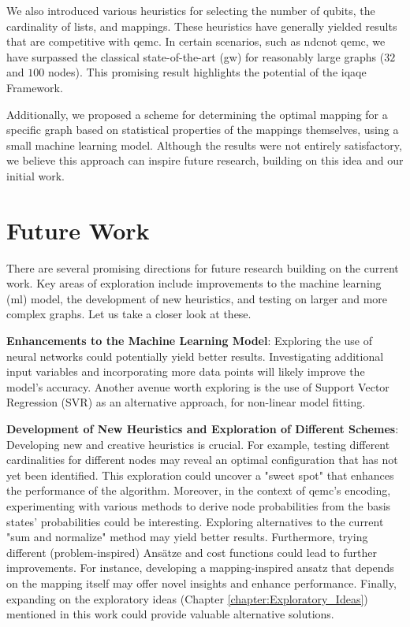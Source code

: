 We also introduced various heuristics for selecting the number of qubits, the cardinality of lists, and mappings. These heuristics have generally yielded results that are competitive with \acrshort{qemc}. In certain scenarios, such as \acrshort{ndcnot} \acrshort{qemc}, we have surpassed the classical state-of-the-art (\acrshort{gw}) for reasonably large graphs ($32$ and $100$ nodes). This promising result highlights the potential of the \acrshort{iqaqe} Framework. %

Additionally, we proposed a scheme for determining the optimal mapping for a specific graph based on statistical properties of the mappings themselves, using a small machine learning model. Although the results were not entirely satisfactory, we believe this approach can inspire future research, building on this idea and our initial work. %


\section{Future Work}
\label{section:future}
There are several promising directions for future research building on the current work. Key areas of exploration include improvements to the machine learning (\acrshort{ml}) model, the development of new heuristics, and testing on larger and more complex graphs. Let us take a closer look at these.
\vspace{5mm}

\noindent\textbf{Enhancements to the Machine Learning Model}: %
\noindent Exploring the use of neural networks could potentially yield better results. Investigating additional input variables and incorporating more data points will likely improve the model's accuracy. Another avenue worth exploring is the use of Support Vector Regression (SVR) as an alternative approach, for non-linear model fitting.
\vspace{5mm}

\noindent\textbf{Development of New Heuristics and Exploration of Different Schemes}: Developing new and creative heuristics is crucial. For example, testing different cardinalities for different nodes may reveal an optimal configuration that has not yet been identified. This exploration could uncover a "sweet spot" that enhances the performance of the algorithm. Moreover, in the context of \acrshort{qemc}'s encoding, experimenting with various methods to derive node probabilities from the basis states' probabilities could be interesting. Exploring alternatives to the current "sum and normalize" method may yield better results. Furthermore, trying different (problem-inspired) Ansätze and cost functions could lead to further improvements. For instance, developing a mapping-inspired ansatz that depends on the mapping itself may offer novel insights and enhance performance. Finally, expanding on the exploratory ideas (Chapter \ref{chapter:Exploratory_Ideas}) mentioned in this work could provide valuable alternative solutions.
\vspace{5mm}

